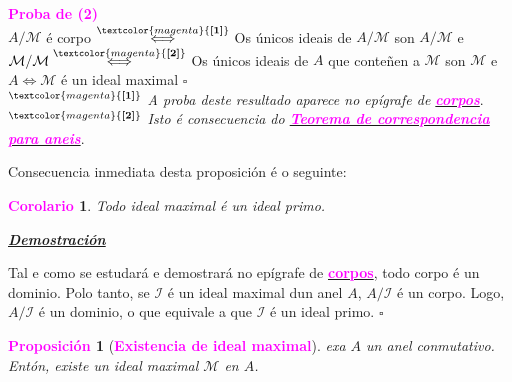 \documentclass[twoside]{report}
\newcommand{\magbf}[1]{\textcolor{magenta}{\textbf{#1}}} %
\theoremstyle{mystyle}
\newtheorem{prop}{\magbf{Proposición}}[chapter]
\newtheorem{cor}{\magbf{Corolario}}[chapter]
\newenvironment{proposition}
{\begin{mdframed}[linecolor = magenta,backgroundcolor = classicrose, linewidth = 2mm]\begin{prop}}
{\end{prop}\end{mdframed}}
\newenvironment{corollary}
{\begin{mdframed}[linecolor = magenta,backgroundcolor = classicrose, linewidth = 2mm]\begin{cor}}
{\end{cor}\end{mdframed}}
\begin{document}
\vspace{3mm}

\noindent \magbf{Proba de (2)}\\

\noindent $A/\mathcal{M}$ é corpo $\overset{\magbf{[1]}}{\Longleftrightarrow}$ Os únicos ideais de $A/\mathcal{M}$ son $A/\mathcal{M}$ e $\mathcal{M}/\mathcal{M} \overset{\magbf{[2]}}{\Longleftrightarrow}$ Os únicos ideais de $A$ que conteñen a $\mathcal{M}$ son $\mathcal{M}$ e $A \Longleftrightarrow \mathcal{M}$ é un ideal maximal \hspace{2mm} $\square$ \\

\noindent $^{\magbf{[1]}}$ \textit{A proba deste resultado aparece no epígrafe de \hyperref[corpos]{\magbf{corpos}}}.\\
\noindent $^{\magbf{[2]}}$ \textit{Isto é consecuencia do \hyperref[th2.4]{\magbf{Teorema de correspondencia para aneis}}}.\\

\vspace{3mm}

\noindent Consecuencia inmediata desta proposición é o seguinte:\\

\begin{corollary} \label{cor2.1}
Todo ideal maximal é un ideal primo.
\end{corollary}

\vspace{2mm}

\noindent \textbf{\textit{\underline{Demostración}}}

\vspace{2mm}

\noindent Tal e como se estudará e demostrará no epígrafe de \hyperref[corpos]{\magbf{corpos}}, todo corpo é un dominio. Polo tanto, se $\mathcal{I}$ é un ideal maximal dun anel $A$, $A/\mathcal{I}$ é un corpo. Logo, $A/\mathcal{I}$ é un dominio, o que equivale a que $\mathcal{I}$ é un ideal primo. $\square$\\

\vspace{3mm}

\begin{proposition}[\magbf{Existencia de ideal maximal}] \label{prop2.9}
exa $A$ un anel conmutativo. Entón, existe un ideal maximal $\mathcal{M}$ en $A$.
\end{proposition}

\vspace{2mm}
\end{document}
